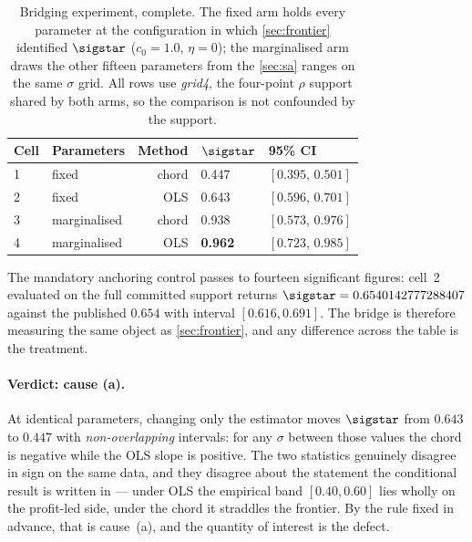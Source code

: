 \begin{table}[htbp]
\centering
\small
\caption{Bridging experiment, complete. The fixed arm holds every parameter at
the configuration in which \cref{sec:frontier} identified $\sigstar$
($c_0 = 1.0$, $\eta = 0$); the marginalised arm draws the other fifteen
parameters from the \cref{sec:sa} ranges on the same $\sigma$ grid. All rows
use \emph{grid4}, the four-point $\rho$ support shared by both arms, so the
comparison is not confounded by the support.}
\label{tab:bridge}
\begin{tabular}{llrll}
\toprule
Cell & Parameters & Method & $\sigstar$ & 95\% CI\\
\midrule
1 & fixed        & chord & 0.447 & $[0.395,\,0.501]$\\
2 & fixed        & OLS   & 0.643 & $[0.596,\,0.701]$\\
3 & marginalised & chord & 0.938 & $[0.573,\,0.976]$\\
4 & marginalised & OLS   & \textbf{0.962} & $[0.723,\,0.985]$\\
\bottomrule
\end{tabular}
\end{table}

The mandatory anchoring control passes to fourteen significant figures: cell~2
evaluated on the full committed support returns
$\sigstar = 0.6540142777288407$ against the published $0.654$ with interval
$[0.616, 0.691]$. The bridge is therefore measuring the same object as
\cref{sec:frontier}, and any difference across the table is the treatment.

\paragraph{Verdict: cause (a).} At identical parameters, changing only the
estimator moves $\sigstar$ from $0.643$ to $0.447$ with \emph{non-overlapping}
intervals: for any $\sigma$ between those values the chord is negative while
the OLS slope is positive. The two statistics genuinely disagree in sign on the
same data, and they disagree about the statement the conditional result is
written in --- under OLS the empirical band $[0.40, 0.60]$ lies wholly on the
profit-led side, under the chord it straddles the frontier. By the rule fixed
in advance, that is cause~(a), and the quantity of interest is the defect.

